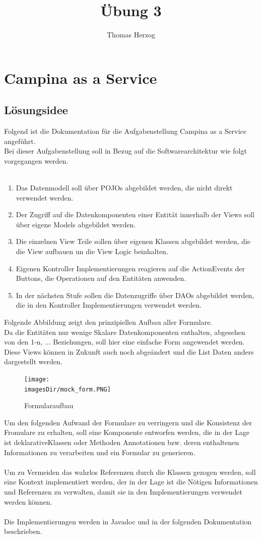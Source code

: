 \documentclass[11pt, a4paper, twoside]{article}   	%
\title{Übung 3}
\author{Thomas Herzog}
\newcommand{\imagesDir}{images}
\newcommand{\ideaSection}{Lösungsidee}
\begin{document}
\setlength{\headheight}{15mm}

{\color{myred}
	\section
		{Campina as a Service}
}

\subsection{\ideaSection}
Folgend ist die Dokumentation für die Aufgabenstellung Campina as a Service angeführt. \\
Bei dieser Aufgabenstellung soll in Bezug auf die Softwarearchitektur wie folgt vorgegangen werden.\\\\
\begin{enumerate}
	\item Das Datenmodell soll über POJOs abgebildet werden, die nicht direkt verwendet werden.
	\item Der Zugriff auf die Datenkomponenten einer Entität innerhalb der Views soll über eigene Models abgebildet werden.
	\item Die einzelnen View Teile sollen über eigenen Klassen abgebildet werden, die die View aufbauen un die View Logic beinhalten.
	\item Eigenen Kontroller Implementierungen reagieren auf die ActionEvents der Buttons, die Operationen auf den Entitäten anwenden.
	\item In der nächsten Stufe sollen die Datenzugriffe über DAOs abgebildet werden, die in den Kontroller Implementierungen verwendet werden.
\end{enumerate}
Folgende Abbildung zeigt den prinzipiellen Aufbau aller Formulare.\\
Da die Entitäten nur wenige Skalare Datenkomponenten enthalten, abgesehen von den 1-n, ... Beziehungen, soll hier eine einfache Form angewendet werden.\\
Diese Views können in Zukunft auch noch abgeändert und die List Daten anders dargestellt werden. 
\begin{figure}[H]
	\centering
	\texttt{[image: \\imagesDir/mock\_form.PNG]}
	\caption
	{Formularaufbau}
\end{figure}
Um den folgenden Aufwand der Formulare zu verringern und die Konsistenz der Fromulare zu erhalten, soll eine Komponente entworfen werden, die in der Lage ist deklarativeKlassen oder Methoden Annotationen bzw. deren enthaltenen Informationen zu verarbeiten und ein Formular zu generieren.\\\\
Um zu Vermeiden das wahrlos Referenzen durch die Klassen gezogen werden, soll eine Kontext implementiert werden, der in der Lage ist die Nötigen Informationen und Referenzen zu verwalten, damit sie in den Implementierungen verwendet werden können.\\\\
Die Implementierungen werden in Javadoc und in der folgenden Dokumentation beschrieben.
\end{document}
